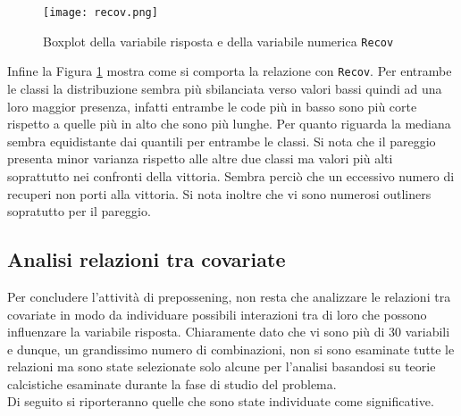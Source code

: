 \begin{figure}[htbp]
	\begin{center}
		\texttt{[image: recov.png]}
		\caption{Boxplot della variabile risposta e della variabile numerica \texttt{Recov}} \label{fig:recov}
	\end{center}
\end{figure} 

Infine la Figura \ref{fig:recov} mostra come si comporta la relazione con \texttt{Recov}. Per entrambe le classi la distribuzione sembra più sbilanciata verso valori bassi quindi ad una loro maggior presenza, infatti entrambe le code più in basso sono più corte rispetto a quelle più in alto che sono più lunghe. Per quanto riguarda la mediana sembra equidistante dai quantili per entrambe le classi. Si nota che il pareggio presenta minor varianza rispetto alle altre due classi ma valori più alti soprattutto nei confronti della vittoria. Sembra perciò che un eccessivo numero di recuperi non porti alla vittoria. Si nota inoltre che vi sono numerosi outliners sopratutto per il pareggio.

\subsection{Analisi relazioni tra covariate} 
Per concludere l'attività di prepossening, non resta che analizzare le relazioni tra covariate in modo da individuare possibili interazioni tra di loro che possono influenzare la variabile risposta. Chiaramente dato che vi sono più di 30 variabili e dunque, un grandissimo numero di combinazioni, non si sono esaminate tutte le relazioni ma sono state selezionate solo alcune per l'analisi basandosi su teorie calcistiche esaminate durante la fase di studio del problema.\\
Di seguito si riporteranno quelle che sono state individuate come significative.\\


